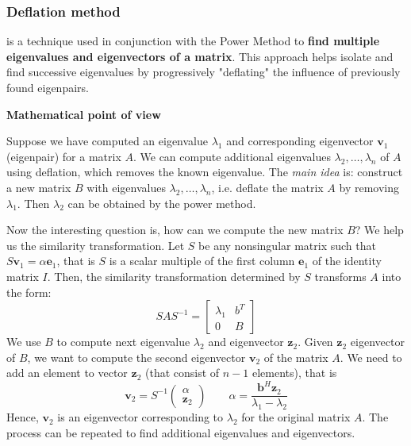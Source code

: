 \subsubsection{Deflation method}

 is a technique used in conjunction with the Power Method to \textbf{find multiple eigenvalues and eigenvectors of a matrix}. This approach helps isolate and find successive eigenvalues by progressively "deflating" the influence of previously found eigenpairs.

\highspace
\begin{flushleft}
    \textcolor{Green3}{ \textbf{Mathematical point of view}}
\end{flushleft}
Suppose we have computed an eigenvalue $\lambda_{1}$ and corresponding eigenvector $\mathbf{v}_{1}$ (eigenpair) for a matrix $A$. We can compute additional eigenvalues $\lambda_{2}, \dots, \lambda_{n}$ of $A$ using deflation, which removes the known eigenvalue. The \emph{main idea} is: construct a new matrix $B$ with eigenvalues $\lambda_{2}, \dots, \lambda_{n}$, i.e. deflate the matrix $A$ by removing $\lambda_{1}$. Then $\lambda_{2}$ can be obtained by the power method.

\highspace
Now the interesting question is, how can we compute the new matrix $B$? We help us the similarity transformation. Let $S$ be any nonsingular matrix such that $S\mathbf{v}_{1} = \alpha\mathbf{e}_{1}$, that is $S$ is a scalar multiple of the first column $\mathbf{e}_{1}$ of the identity matrix $I$. Then, the similarity transformation determined by $S$ transforms $A$ into the form:
\begin{equation}
    SAS^{-1} = \begin{bmatrix}
        \lambda_{1} & b^{T} \\
        0 & B
    \end{bmatrix}
\end{equation}
We use $B$ to compute next eigenvalue $\lambda_{2}$ and eigenvector $\mathbf{z}_{2}$. Given $\mathbf{z}_{2}$ eigenvector of $B$, we want to compute the second eigenvector $\mathbf{v}_{2}$ of the matrix $A$. We need to add an element to vector $\mathbf{z}_{2}$ (that consist of $n - 1$ elements), that is
\begin{equation*}
    \mathbf{v}_{2} = S^{-1}\begin{pmatrix}
        \alpha \\ \mathbf{z}_{2}
    \end{pmatrix}
    \hspace{2em}
    \alpha = \dfrac{\mathbf{b}^{H} \mathbf{z}_{2}}{\lambda_{1} - \lambda_{2}}
\end{equation*}
Hence, $\mathbf{v}_{2}$ is an eigenvector corresponding to $\lambda_{2}$ for the original matrix $A$. The process can be repeated to find additional eigenvalues and eigenvectors.

